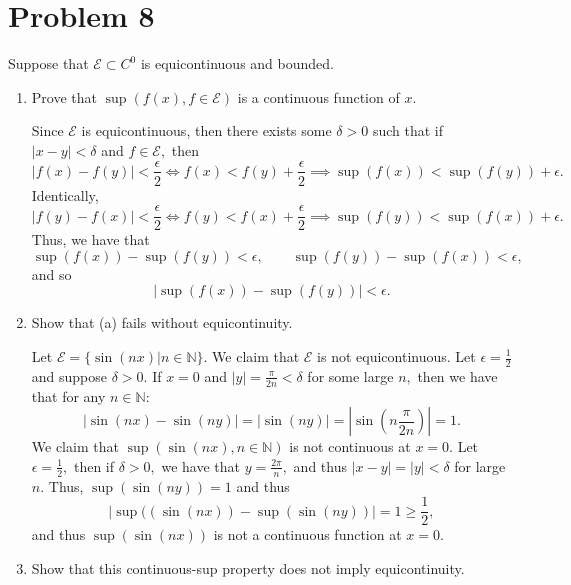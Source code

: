 \documentclass[11pt]{article}
\newcommand{\bbN}{\mathbb{N}}
\begin{document}
\section*{Problem 8}
\begin{problem}
    Suppose that $\mathcal{E}\subset C^0$ is equicontinuous and bounded.
\end{problem}
\begin{enumerate}
    \item 
    \begin{problem}
        Prove that $\sup(f(x), f\in \mathcal{E})$ is a continuous function of $x.$
    \end{problem}
    \begin{solution}
        Since $\mathcal{E}$ is equicontinuous, then there exists some $\delta>0$ such that if $|x-y|<\delta$ and $f\in \mathcal{E},$ then 
        \[|f(x) - f(y)|< \frac{\epsilon}{2} \iff f(x)< f(y) + \frac{\epsilon}{2} \implies \sup(f(x))< \sup(f(y)) + \epsilon.\] Identically, 
        \[|f(y)- f(x)|< \frac{\epsilon}{2} \iff f(y)< f(x) + \frac{\epsilon}{2} \implies \sup(f(y))< \sup(f(x)) + \epsilon.\]
        Thus, we have that 
        \[\sup(f(x)) - \sup(f(y)) < \epsilon, \qquad \sup(f(y)) - \sup(f(x)) < \epsilon,\]
        and so \[|\sup(f(x)) - \sup(f(y))|< \epsilon.\]
    \end{solution}
    \item 
    \begin{problem}
        Show that (a) fails without equicontinuity.
    \end{problem}
    \begin{solution}
        Let $\mathcal{E} = \{\sin(nx) | n \in \bbN\}.$ We claim that $\mathcal{E}$ is not equicontinuous. Let $\epsilon = \frac{1}{2}$ and suppose $\delta>0.$ If $x = 0$ and $|y| = \frac{\pi}{2n}< \delta$ for some large $n,$ then we have that for any $n \in \bbN:$
        \[|\sin(nx) - \sin(ny)| = |\sin(ny)|= |\sin(n \frac{\pi}{2n})| = 1.\] We claim that $\sup(\sin(nx), n \in \bbN)$ is not continuous at $x = 0.$ Let $\epsilon = \frac{1}{2},$ then if $\delta>0,$ we have that $y = \frac{2\pi}{n},$ and thus $|x-y| = |y|< \delta$ for large $n.$ Thus, $\sup(\sin(ny)) = 1$ and thus
        \[|\sup((\sin(nx)) - \sup(\sin(ny))| = 1\geq \frac{1}{2},\] and thus $\sup(\sin(nx))$ is not a continuous function at $x=0.$
        \end{solution}
    \item 
    \begin{problem}
        Show that this continuous-sup property does not imply equicontinuity.

\end{problem}
\end{enumerate}
\end{document}
